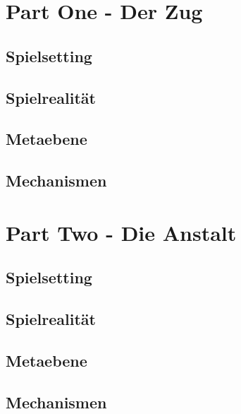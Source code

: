 \documentclass[a4paper, 12pt]{scrartcl}
\begin{document}
    \section{Part One - Der Zug}
    \subsection{Spielsetting}
    \subsection{Spielrealität}
    \subsection{Metaebene}
    \subsection{Mechanismen}

    \section{Part Two - Die Anstalt}
    \subsection{Spielsetting}
    \subsection{Spielrealität}
    \subsection{Metaebene}
    \subsection{Mechanismen}
\end{document}
